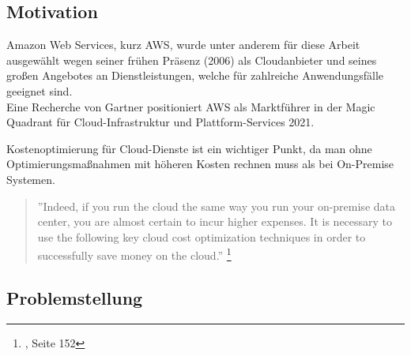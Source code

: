 \subsection{Motivation}
Amazon Web Services, kurz AWS, wurde unter anderem für diese Arbeit ausgewählt wegen seiner frühen Präsenz (2006) als Cloudanbieter und seines großen Angebotes an Dienstleistungen, welche für zahlreiche Anwendungsfälle geeignet sind.
\\
Eine Recherche von Gartner positioniert AWS als Marktführer in der Magic Quadrant für Cloud-Infrastruktur und Plattform-Services 2021.
{\cite{G01}}
\begin{comment} GELÖSCHT, WEIL DIESE EINE BEHAUPTUNG IST (25.10.2021)
\\\\
Für viele Unternehmen ist eine große Herausforderung, die Kosten von Cloud-Diensten übersichtlich zu halten und Optimierungsmöglichkeit leicht zu erkennen. Zusätzlich besteht die Gefahr, unangenehme Überraschungen in einer Rechnung zu bekommen, weil keine Grenze für den Konsum von Cloud-Diensten festgelegt wurde. 
\end{comment}
Kostenoptimierung für Cloud-Dienste ist ein wichtiger Punkt, da man ohne Optimierungsmaßnahmen mit höheren Kosten rechnen muss als bei On-Premise Systemen.
\\
\begin{quote}
    ”Indeed, if you run the cloud the same way you run your on-premise data center, you are almost certain to incur higher expenses. It is necessary to use the following key cloud cost optimization techniques in order to successfully save money on the cloud.”
    \footnote{{\cite{CCB}}, Seite 152}
\end{quote}

\subsection{Problemstellung}

